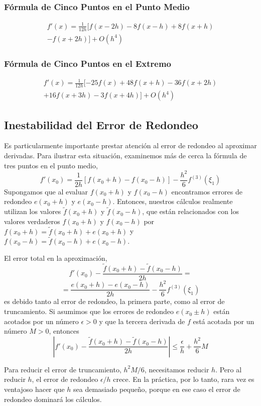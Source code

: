 \subsubsection{Fórmula de Cinco Puntos en el Punto Medio}
\begin{multline}
    f'(x) = \frac{1}{12h} [ f(x - 2h) - 8f(x - h) + 8 f(x + h) \\
    - f(x + 2h) ] + O(h^4)
\end{multline}

\subsubsection{Fórmula de Cinco Puntos en el Extremo}
\begin{multline}
    f'(x) = \frac{1}{12h} [ -25f(x) + 48 f(x + h) - 36 f(x + 2h) \\
    + 16 f(x + 3h) - 3 f(x + 4h) ] + O(h^4)
\end{multline}

\subsection{Inestabilidad del Error de Redondeo}
Es particularmente importante prestar atención al error de redondeo al aproximar derivadas. Para ilustrar esta situación, examinemos más de cerca la fórmula de tres puntos en el punto medio,
\[ f'(x_0) = \frac{1}{2h} [f(x_0 + h) - f(x_0 - h)] - \frac{h^2}{6} f^{(3)}(\xi_1) \]
Supongamos que al evaluar $f(x_0 + h)$ y $f(x_0 - h)$ encontramos errores de redondeo $e(x_0 + h)$ y $e(x_0 - h)$. Entonces, nuestros cálculos realmente utilizan los valores $\tilde{f}(x_0 + h)$ y $\tilde{f}(x_0 - h)$, que están relacionados con los valores verdaderos $f(x_0 + h)$ y $f(x_0 - h)$ por $ f(x_0 + h) = \tilde{f}(x_0 + h) + e(x_0 + h) $ y $ f(x_0 - h) = \tilde{f}(x_0 - h) + e(x_0 - h) $.

El error total en la aproximación,
\[ f'(x_0) - \frac{\tilde{f}(x_0 + h) - \tilde{f}(x_0 - h)}{2h} = \]
\[ = \frac{e(x_0 + h) - e (x_0 - h)}{2h} - \frac{h^2}{6} f^{(3)}(\xi_1)\]
es debido tanto al error de redondeo, la primera parte, como al error de truncamiento. Si asumimos que los errores de redondeo $e(x_0 \pm h)$ están acotados por un número $\epsilon > 0$ y que la tercera derivada de $f$ está acotada por un número $M > 0$, entonces 
\[ \left| f'(x_0) - \frac{\tilde{f}(x_0 + h) - \tilde{f}(x_0 - h)}{2h} \right| \leq \frac{\epsilon}{h} + \frac{h^2}{6}M\]

Para reducir el error de truncamiento, $h^2 M/6$, necesitamos reducir $h$. Pero al reducir $h$, el error de redondeo $\epsilon/h$ crece. En la práctica, por lo tanto, rara vez es ventajoso hacer que $h$ sea demasiado pequeño, porque en ese caso el error de redondeo dominará los cálculos.

